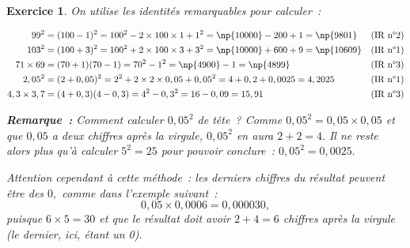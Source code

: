 \documentclass[10pt]{article}
\newtheorem{exo}{Exercice}
\begin{document}
\begin{exo}

On utilise les identités remarquables pour calculer~:

\begin{align*}
99^2&=(100-1)^2=100^2-2\times 100\times 1+1^2=\np{10000}-200+1=\np{9801}&&\text{(IR n°2)}\\
103^2&=(100+3)^2=100^2+2\times 100\times 3+3^2=\np{10000}+600+9=\np{10609}&&\text{(IR n°1)}\\
71\times 69&=(70+1)(70-1)=70^2-1^2=\np{4900}-1=\np{4899}&&\text{(IR n°3)}\\
2,05^2&=(2+0,05)^2=2^2+2\times 2\times 0,05+0,05^2=4+0,2+0,0025=4,2025&&\text{(IR n°1)}\\
4,3\times 3,7&=(4+0,3)(4-0,3)=4^2-0,3^2=16-0,09=15,91&&\text{(IR n°3)}
\end{align*}

\textbf{Remarque~:} Comment calculer $0,05^2$ de tête~? Comme $0,05^2=0,05\times 0,05$ et que $0,05$ a deux chiffres après la virgule, $0,05^2$ en aura $2+2=4.$ Il ne reste alors plus qu'à calculer $5^2=25$ pour pouvoir conclure~: $0,05^2=0,0025.$

Attention cependant à cette méthode~: les derniers chiffres du résultat peuvent être des $0,$ comme dans l'exemple suivant~:
\[0,05\times 0,0006=0,000030,\] puisque $6\times 5=30$ et que le résultat doit avoir $2+4=6$ chiffres après la virgule (le dernier, ici, étant un 0).

\end{exo}
\end{document}
